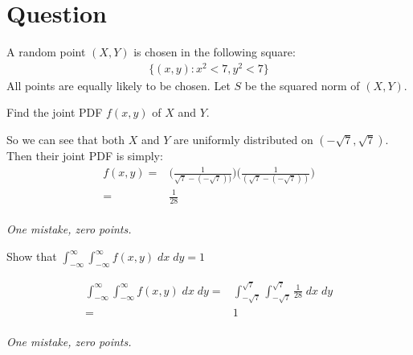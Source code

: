 \section*{Question}

A random point $(X,Y)$ is chosen in the following square:
\begin{align*}
    \{(x, y) : x^2 < 7,  y^2 < 7 \}
\end{align*}
All points are equally likely to be chosen. Let $S$ be the squared norm of $(X,Y)$.
\begin{exercise}[0.5]
Find the joint PDF $f(x,y)$ of $X$ and $Y$.
\begin{solution}
So we can see that both $X$ and $Y$ are uniformly distributed on $(-\sqrt{7}, \sqrt{7})$. Then their joint PDF is simply:
\begin{align*}
    f(x,y) =& \Big(\frac{1}{\sqrt{7} - (-\sqrt{7}))} \Big) \Big(\frac{1}{(\sqrt{7} - (-\sqrt{7}))} \Big) \\
    =& \frac{1}{28}
\end{align*}\\
\textit{One mistake, zero points.}
\end{solution}
\end{exercise}

\begin{exercise}[0.5]
Show that $\int_{-\infty}^\infty \int_{-\infty}^\infty f(x,y) \; dx \; dy = 1$
\begin{solution}
 \begin{align*}
      \int_{-\infty}^\infty \int_{-\infty}^\infty f(x,y) \; dx \; dy =& \int_{-\sqrt{7}}^{\sqrt{7}} \int_{-\sqrt{7}}^{\sqrt{7}} \frac{1}{28} \; dx \; dy \\
      =& 1
    \end{align*} \\
    \textit{One mistake, zero points.}
\end{solution}

\end{exercise}

